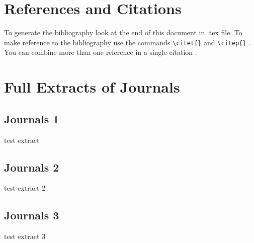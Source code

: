 \documentclass{UoNMCHA}
\numberwithin{equation}{section}
\begin{document}
%
%
%
%
\section{References and Citations}\label{sec:RefCite}
To generate the bibliography look at the end of this document in .tex file. To make reference to the bibliography use the commands \verb|\citet{}| and \verb|\citep{}| \citep{strunk2007elements}. You can combine more than one reference in a single citation \citep{troyka1999simon, jay1995write}.






\appendix
\section{Full Extracts of Journals}
\subsection{Journals 1}
test extract
\subsection{Journals 2}
test extract 2
\subsection{Journals 3}
test extract 3
\end{document}
